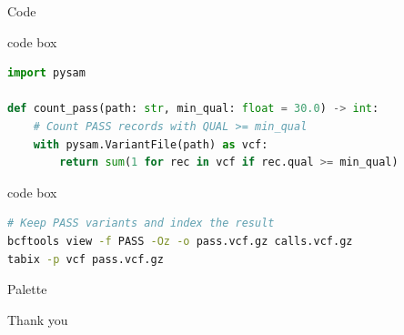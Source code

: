 \documentclass[aspectratio=169, 10pt]{beamer}
\newenvironment{codebox}{%
  \par\vskip 1mm\begin{beamercolorbox}[sep=0pt]{code box}}{\end{beamercolorbox}}
\newcommand{\oiswatch}[5]{%
  \fill[#1] ({#4*3.55}, {-#5*2.9}) rectangle ++(3.3, -1.4);
  \node[anchor=north west, font=\small, text=oiInk, align=left, inner sep=0pt]
    at ({#4*3.55}, {-#5*2.9-1.45}) {#2\\[-0.4ex]{\footnotesize\ttfamily\##3}};}
\begin{document}
\begin{frame}[fragile]{Code}
\begin{codebox}
\begin{lstlisting}[language=Python]
import pysam

def count_pass(path: str, min_qual: float = 30.0) -> int:
    # Count PASS records with QUAL >= min_qual
    with pysam.VariantFile(path) as vcf:
        return sum(1 for rec in vcf if rec.qual >= min_qual)
\end{lstlisting}
\end{codebox}
\begin{codebox}
\begin{lstlisting}[language=bash]
# Keep PASS variants and index the result
bcftools view -f PASS -Oz -o pass.vcf.gz calls.vcf.gz
tabix -p vcf pass.vcf.gz
\end{lstlisting}
\end{codebox}
\end{frame}

\begin{frame}{Palette}
  \centering
\end{frame}

\begin{frame}[standout]
  Thank you
\end{frame}
\end{document}
